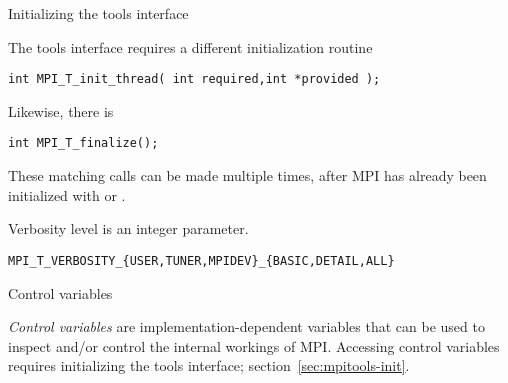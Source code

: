 
\begin{mpifour}

 {Initializing the tools interface}
\label{sec:mpitools-init}

The tools interface requires a different initialization routine
\begin{lstlisting}
int MPI_T_init_thread( int required,int *provided );
\end{lstlisting}
Likewise, there is 
\begin{lstlisting}
int MPI_T_finalize();
\end{lstlisting}
These matching calls can be made multiple times,
after MPI has already been initialized with
 or .

Verbosity level is an integer parameter.
\begin{verbatim}
MPI_T_VERBOSITY_{USER,TUNER,MPIDEV}_{BASIC,DETAIL,ALL}
\end{verbatim}

 {Control variables}
\label{sec:mpit-cvar}

\emph{Control variables} are implementation-dependent variables
that can be used to inspect and/or control the internal workings of MPI.
Accessing control variables requires initializing the tools interface;
section~\ref{sec:mpitools-init}.


\end{mpifour}
